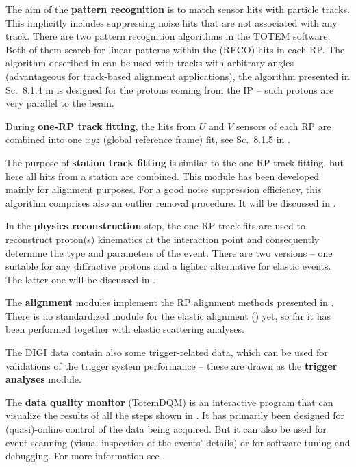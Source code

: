 \> The aim of the {\bf pattern recognition} is to match sensor hits with particle tracks. This implicitly includes suppressing noise hits that are not associated with any track. There are two pattern recognition algorithms in the TOTEM software. Both of them search for linear patterns within the (RECO) hits in each RP. The algorithm described in  can be used with tracks with arbitrary angles (advantageous for track-based alignment applications), the algorithm presented in Sc.~8.1.4 in  is designed for the protons coming from the IP -- such protons are very parallel to the beam.

\> During {\bf one-RP track fitting}, the hits from $U$ and $V$ sensors of each RP are combined into one $xyz$ (global reference frame) fit, see Sc.~8.1.5 in .

\> The purpose of {\bf station track fitting} is similar to the one-RP track fitting, but here all hits from a station are combined. This module has been developed mainly for alignment purposes. For a good noise suppression efficiency, this algorithm comprises also an outlier removal procedure. It will be discussed in .

\> In the {\bf physics reconstruction} step, the one-RP track fits are used to reconstruct proton(s) kinematics at the interaction point and consequently determine the type and parameters of the event. There are two versions -- one suitable for any diffractive protons and a lighter alternative for elastic events. The latter one will be discussed in .

\> The {\bf alignment} modules implement the RP alignment methods presented in . There is no standardized module for the elastic alignment () yet, so far it has been performed together with elastic scattering analyses.

\> The DIGI data contain also some trigger-related data, which can be used for validations of the trigger system performance -- these are drawn as the {\bf trigger analyses} module.

\> The {\bf data quality monitor} (TotemDQM) is an interactive program that can visualize the results of all the steps shown in . It has primarily been designed for (quasi)-online control of the data being acquired. But it can also be used for event scanning (visual inspection of the events' details) or for software tuning and debugging. For more information see .



